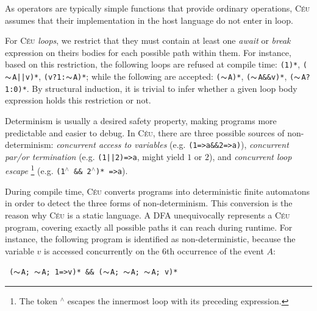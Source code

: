 \documentclass[10pt]{sigplan-proc-varsize-sensys11}
\newcommand{\2}{\;\;}
\newcommand{\5}{\;\;\;\;\;}
\newcommand{\til}{$\thicksim$}
\newcommand{\brk}{\textbf{\small{$^\wedge$}}}
\newcommand{\CEU}{\textsc{C\'{e}u}}
\newcommand{\code}[1] {{\small{\texttt{#1}}}}
\newcommand{\Code}[1] {\texttt{#1}}
\begin{document}
As operators are typically simple functions that provide ordinary operations, 
\CEU{} assumes that their implementation in the host language do not enter in 
loop.

For \CEU{} \emph{loops}, we restrict that they must contain at least one 
\emph{await} or \emph{break} expression on theirs bodies for each possible path 
within them.
For instance, based on this restriction, the following loops are refused at 
compile time:
\code{(1)*}, \code{(\til{}A||v)*}, \code{(v?1:\til{}A)*}; while the following 
are accepted: \code{(\til{}A)*}, \code{(\til{}A\&\&v)*}, \code{(\til{}A?1:0)*}.
By structural induction, it is trivial to infer whether a given loop body 
expression holds this restriction or not.

Determinism is usually a desired safety property, making programs 
more predictable and easier to debug.
In \CEU, there are three possible sources of non-determinism:
\emph{concurrent access to variables} (e.g. \code{(1=>a\&\&2=>a)}),
\emph{concurrent \emph{par/or} termination} (e.g. \code{(1||2)=>a}, might yield 
$1$ or $2$), and \emph{concurrent loop escape}%
\footnote{ The token \brk{} escapes the innermost loop with its preceding 
expression. }
(e.g. \code{(1\brk{} \&\& 2\brk)* =>a}).

During compile time, \CEU{} converts programs into deterministic finite 
automatons in order to detect the three forms of non-determinism.
This conversion is the reason why \CEU{} is a static language.
A DFA unequivocally represents a \CEU{} program, covering exactly all possible 
paths it can reach during runtime.
For instance, the following program is identified as non-deterministic, because 
the variable $v$ is accessed concurrently on the 6th occurrence of the event 
$A$:

\Code{
(\til{}A; \til{}A; 1=>v)*
\&\&
(\til{}A; \til{}A; \til{}A; v)*
}
\end{document}
